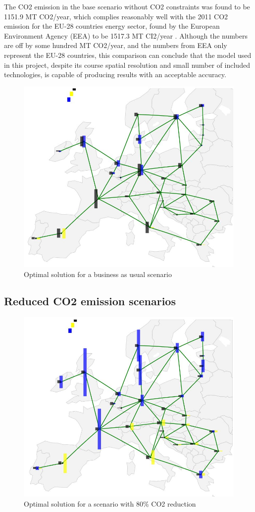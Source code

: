 The CO2 emission in the base scenario without CO2 constraints was found to be 1151.9 MT CO2/year, which complies reasonably well with the 2011 CO2 emission for the EU-28 countries energy sector, found by the European Environment Agency (EEA) to be 1517.3 MT CI2/year \cite{eea_co2_emission}. Although the numbers are off by some hundred MT CO2/year, and the numbers from EEA only represent the EU-28 countries, this comparison can conclude that the model used in this project, despite its course spatial resolution and small number of included technologies, is capable of producing results with an acceptable accuracy. 


\begin{figure}[H]\centering
	\includegraphics[width=.8\textwidth]{./Images/optimal_solution_00}
	\caption{Optimal solution for a business as usual scenario }
	\label{fig:Optimal_Solution_00}
\end{figure}


\subsection{Reduced CO2 emission scenarios}


\begin{figure}[H]\centering
	\includegraphics[width=.8\textwidth]{./Images/optimal_solution_80}
	\caption{Optimal solution for a scenario with 80\% CO2 reduction}
	\label{fig:Optimal_Solution_80}
\end{figure}

